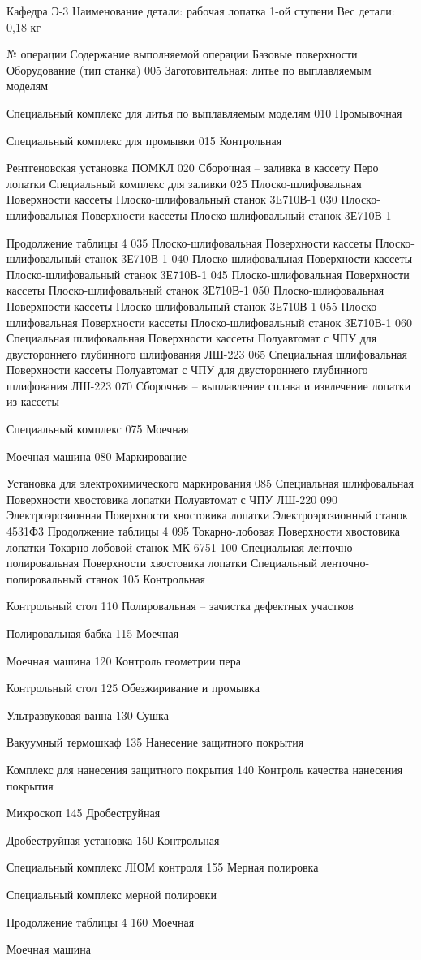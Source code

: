 Кафедра Э-3
Наименование детали: рабочая лопатка 1-ой ступени
Вес детали: 0,18 кг

№ операции
Содержание выполняемой операции
Базовые поверхности
Оборудование (тип станка)
005
Заготовительная: литье по выплавляемым моделям

Специальный комплекс для литья по выплавляемым моделям
010
Промывочная

Специальный комплекс для промывки
015
Контрольная

Рентгеновская установка ПОМКЛ
020
Сборочная – заливка в кассету
Перо лопатки
Специальный комплекс для заливки
025
Плоско-шлифовальная
Поверхности кассеты
Плоско-шлифовальный станок 3Е710В-1
030
Плоско-шлифовальная
Поверхности кассеты
Плоско-шлифовальный станок 3Е710В-1

Продолжение таблицы 4
035
Плоско-шлифовальная
Поверхности кассеты
Плоско-шлифовальный станок 3Е710В-1
040
Плоско-шлифовальная
Поверхности кассеты
Плоско-шлифовальный станок 3Е710В-1
045
Плоско-шлифовальная
Поверхности кассеты
Плоско-шлифовальный станок 3Е710В-1
050
Плоско-шлифовальная
Поверхности кассеты
Плоско-шлифовальный станок 3Е710В-1
055
Плоско-шлифовальная
Поверхности кассеты
Плоско-шлифовальный станок 3Е710В-1
060
Специальная шлифовальная
Поверхности кассеты
Полуавтомат с ЧПУ для двустороннего глубинного шлифования ЛШ-223
065
Специальная шлифовальная
Поверхности кассеты
Полуавтомат с ЧПУ для двустороннего глубинного шлифования ЛШ-223
070
Сборочная – выплавление сплава и извлечение лопатки из кассеты

Специальный комплекс
075
Моечная

Моечная машина
080
Маркирование

Установка для электрохимического маркирования
085
Специальная шлифовальная
Поверхности хвостовика лопатки
Полуавтомат с ЧПУ ЛШ-220
090
Электроэрозионная
Поверхности хвостовика лопатки
Электроэрозионный станок 4531Ф3
Продолжение таблицы 4
095
Токарно-лобовая
Поверхности хвостовика лопатки
Токарно-лобовой станок МК-6751
100
Специальная ленточно-полировальная
Поверхности хвостовика лопатки
Специальный ленточно-полировальный станок
105
Контрольная

Контрольный стол
110
Полировальная – зачистка дефектных участков

Полировальная бабка
115
Моечная

Моечная машина
120
Контроль геометрии пера

Контрольный стол
125
Обезжиривание и промывка

Ультразвуковая ванна
130
Сушка

Вакуумный термошкаф
135
Нанесение защитного покрытия

Комплекс для нанесения защитного покрытия
140
Контроль качества нанесения покрытия

Микроскоп
145
Дробеструйная

Дробеструйная установка
150
Контрольная

Специальный комплекс ЛЮМ контроля
155
Мерная полировка

Специальный комплекс мерной полировки

Продолжение таблицы 4
160
Моечная

Моечная машина
